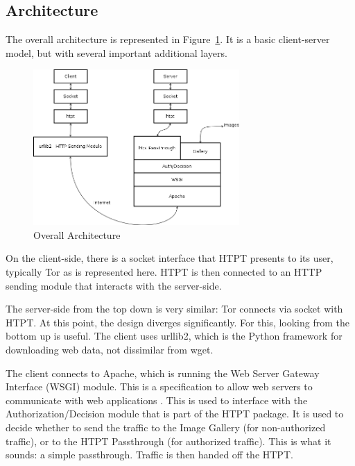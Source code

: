 \subsection{Architecture}
The overall architecture is represented in Figure~\ref{fig:overall_arch}. It is a basic client-server model, but with several important additional layers.

\begin{figure}[t]
\centering
\includegraphics[width=0.7\textwidth]{Overall_architecture}
\caption{Overall Architecture}
\label{fig:overall_arch}
\end{figure}

On the client-side, there is a socket interface that HTPT presents to its user, typically Tor as is represented here. HTPT is then connected to an HTTP sending module that interacts with the server-side.

The server-side from the top down is very similar: Tor connects via socket with HTPT. At this point, the design diverges significantly. For this, looking from the bottom up is useful. 
The client uses urllib2, which is the Python framework for downloading web data, not dissimilar from wget.

The client connects to Apache, which is running the Web Server Gateway Interface (WSGI) module. This is a specification to allow web servers to communicate with web applications \cite{Ref16}. This is used to interface with the Authorization/Decision module that is part of the HTPT package. It is used to decide whether to send the traffic to the Image Gallery (for non-authorized traffic), or to the HTPT Passthrough (for authorized traffic). This is what it sounds: a simple passthrough. Traffic is then handed off the HTPT. 

